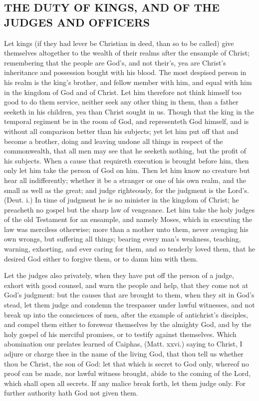 \subsection*{THE DUTY OF KINGS, AND OF THE JUDGES AND OFFICERS}

Let kings (if they had lever be Christian in deed, than 
so to be called) give themselves altogether to the wealth 
of their realms after the ensample of Christ; remembering 
that the people are God's, and not their's, yea are Christ's 
inheritance and possession bought with his blood. The 
most despised person in his realm is the king's brother, 
and fellow member with him, and equal with him in the 
kingdom of God and of Christ. Let him therefore not 
think himself too good to do them service, neither seek any 
other thing in them, than a father seeketh in his children, 
yea than Christ sought in us. Though that the king in the 
temporal regiment be in the room of God, and representeth 
God himself, and is without all comparison better than 
his subjects; yet let him put off that and become a brother, 
doing and leaving undone all things in respect of the commonwealth,
that all men may see that he seeketh nothing, 
but the profit of his subjects. When a cause that requireth 
execution is brought before him, then only let him take the 
person of God on him. Then let him know no creature 
but hear all indifferently; whether it be a stranger or one 
of his own realm, and the small as well as the great; and 
judge righteously, for the judgment is the Lord's. (Deut. 
i.) In time of judgment he is no minister in the kingdom 
of Christ; he preacheth no gospel but the sharp law 
of vengeance. Let him take the holy judges of the old 
Testament for an ensample, and namely Moses, which in 
executing the law was merciless otherwise; more than a 
mother unto them, never avenging his own wrongs, but 
suffering all things; bearing every man's weakness, teaching, 
warning, exhorting, and ever caring for them, and so 
tenderly loved them, that he desired God either to forgive 
them, or to damn him with them. 

Let the judges also privately, when they have put off 
the person of a judge, exhort with good counsel, and 
warn the people and help, that they come not at God's 
judgment: but the causes that are brought to them, 
when they sit in God's stead, let them judge and condemn 
the trespasser under lawful witnesses, and not break up 
into the consciences of men, after the example of antichrist's
disciples, and compel them either to forswear 
themselves by the almighty God, and by the holy gospel 
of his merciful promises, or to testify against themselves. 
Which abomination our prelates learned of Caiphas, 
(Matt. xxvi.) saying to Christ, I adjure or charge thee in 
the name of the living God, that thou tell us whether 
thou be Christ, the son of God: let that which is secret 
to God only, whereof no proof can be made, nor 
lawful witness brought, abide to the coming of the 
Lord, which shall open all secrets. If any malice break 
forth, let them judge only. For further authority hath 
God not given them. 

